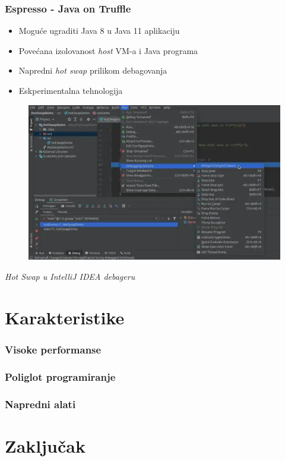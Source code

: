 \documentclass{beamer}
\begin{document}
	\begin{frame}
		\frametitle{Espresso - Java on Truffle}

		\begin{flushleft}
			\begin{itemize}
				\item Moguće ugraditi Java 8 u Java 11 aplikaciju
				\item Povećana izolovanost \emph{host} VM-a i Java programa
				\item Napredni \emph{hot swap} prilikom debagovanja
				\item Eskperimentalna tehnologija
			\end{itemize}
		\end{flushleft}


		\begin{figure}
			\begin{center}
				\includegraphics[width=0.5\linewidth]{imgs/hotswap.png}	
			\end{center} 
		\end{figure}

		\center	
		\textit{Hot Swap u IntelliJ IDEA debageru}

	\end{frame}
	
		
	\section{Karakteristike}
	
	\begin{frame}
		\frametitle{Visoke performanse}
	\end{frame}	

	\begin{frame}
		\frametitle{Poliglot programiranje}
	\end{frame}	

	\begin{frame}
		\frametitle{Napredni alati}
	\end{frame}	

	\section{Zaključak}
	
\end{document}
